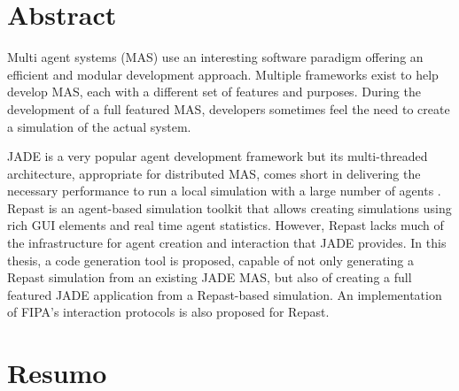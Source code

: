 \chapter*{Abstract}

Multi agent systems (MAS) use an interesting software paradigm offering an efficient and modular development approach. Multiple frameworks exist to help develop MAS, each with a different set of features and purposes. During the development of a full featured MAS, developers sometimes feel the need to create a simulation of the actual system.

JADE \cite{bellifemine2003jade} is a very popular agent development framework but its multi-threaded architecture, appropriate for distributed MAS, comes short in delivering the necessary performance to run a local simulation with a large number of agents \cite{mengistu2008scalability}. Repast \cite{collier2003repast} is an agent-based simulation toolkit that allows creating simulations using rich GUI elements and real time agent statistics. However, Repast lacks much of the infrastructure for agent creation and interaction that JADE provides.
In this thesis, a code generation tool is proposed, capable of not only generating a Repast simulation from an existing JADE MAS, but also of creating a full featured JADE application from a Repast-based simulation. An implementation of FIPA's interaction protocols is also proposed for Repast.



\chapter*{Resumo}



